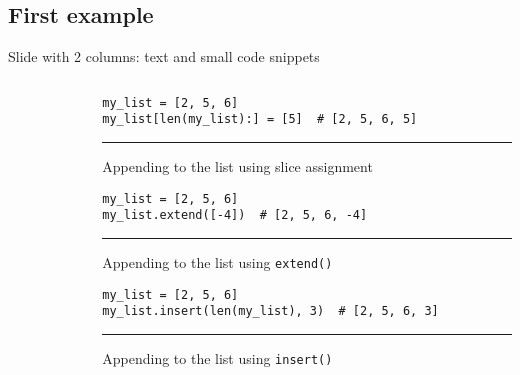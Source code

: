 \documentclass[aspectratio=169, 10pt]{beamer}
\begin{document}
\subsection{First example}
\begin{frame}[fragile]{Slide with 2 columns: text and small code snippets}
    \begin{columns}
    \centering
    \begin{column}{0.52\textwidth}
        \justifying
        \small
        \lipsum[1][4-6]\\[2.5ex]
        \lipsum[2][1-4]
    \end{column}
    \begin{column}{0.45\textwidth}
        \centering
        \scriptsize

        \begin{verbatim}
my_list = [2, 5, 6]
my_list[len(my_list):] = [5]  # [2, 5, 6, 5]
        \end{verbatim}

        \vspace{2pt}
        \hrule
        \vspace{2pt}
        Appending to the list using slice assignment\\[5ex]

        \begin{verbatim}
my_list = [2, 5, 6]
my_list.extend([-4])  # [2, 5, 6, -4]
        \end{verbatim}

        \vspace{2pt}
        \hrule
        \vspace{2pt}
        Appending to the list using \texttt{extend()}\\[5ex]


        \begin{verbatim}
my_list = [2, 5, 6]
my_list.insert(len(my_list), 3)  # [2, 5, 6, 3]
        \end{verbatim}

        \vspace{2pt}
        \hrule
        \vspace{2pt}
        Appending to the list using \texttt{insert()}\\[5ex]

    \end{column}
\end{columns}
\end{frame}
\end{document}
